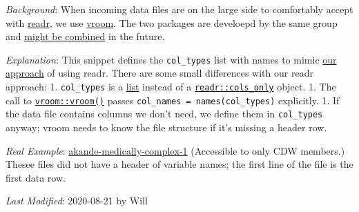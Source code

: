 \documentclass[
]{book}
\begin{document}
\emph{Background}: When incoming data files are on the large side to comfortably accept with \href{https://readr.tidyverse.org/}{readr}, we use \href{https://vroom.r-lib.org/}{vroom}. The two packages are develoepd by the same group and \href{https://github.com/tidyverse/tidyverse.org/pull/375\#issuecomment-564781603}{might be combined} in the future.

\emph{Explanation}: This snippet defines the \texttt{col\_types} list with names to mimic \href{https://ouhscbbmc.github.io/data-science-practices-1/file-prototype-r.html\#chunk-declare}{our approach} of using readr. There are some small differences with our readr approach:
1. \texttt{col\_types} is a \href{https://stat.ethz.ch/R-manual/R-devel/library/base/html/list.html}{list} instead of a \href{https://readr.tidyverse.org/reference/cols.html}{\texttt{readr::cols\_only}} object.
1. The call to \href{https://vroom.r-lib.org/reference/vroom.html}{\texttt{vroom::vroom()}} passes \texttt{col\_names\ =\ names(col\_types)} explicitly.
1. If the data file contains columns we don't need, we define them in \texttt{col\_types} anyway; vroom needs to know the file structure if it's missing a header row.

\emph{Real Example}: \href{https://github.com/OuhscBbmc/akande-medically-complex-1/tree/master/manipulation/ohca}{akande-medically-complex-1} (Accessible to only CDW members.) Thesee files did not have a header of variable names; the first line of the file is the first data row.

\emph{Last Modified}: 2020-08-21 by Will
\end{document}
